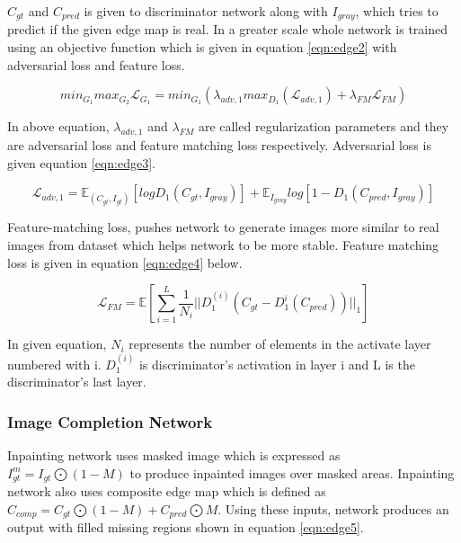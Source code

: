 \(C_{gt}\) and \(C_{pred}\) is given to discriminator network along with \(I_{gray}\), which tries to predict if the given edge map is real. In a greater scale whole network is trained using an objective function which is given in equation \ref{eqn:edge2} with adversarial loss and feature loss.

\begin{equation}
\label{eqn:edge2}
    min_{G_{1}}max_{G_{2}}\mathcal{L}_{G_{1}} = min_{G_{1}}(\lambda_{adv,1}max_{D_{1}}(\mathcal{L}_{adv,1})+\lambda_{FM} \mathcal{L}_{FM})
\end{equation}

In above equation, \(\lambda_{adv,1}\) and \(\lambda_{FM}\) are called regularization parameters and they are adversarial loss and feature matching loss respectively. Adversarial loss is given equation \ref{eqn:edge3}.

\begin{equation}
\label{eqn:edge3}
    \mathcal{L}_{adv,1} = \mathbb{E}_{(C_{gt},I_{gt})}[logD_{1}(C_{gt},I_{gray})]+\mathbb{E}_{I_{gray}}log[1-D_{1} (C_{pred}, I_{gray})]
\end{equation}

Feature-matching loss, pushes network to generate images more similar to real images from dataset which helps network to be more stable. Feature matching loss is given in equation \ref{eqn:edge4} below.

\begin{equation}
\label{eqn:edge4}
    \mathcal{L}_{FM} = \mathbb{E} [ \sum\limits^L_{i=1}{\frac{1}{N_i}|| D_1^(i) (C_{gt}-D_1^{i} (C_{pred})) ||_1} ]
\end{equation}

In given equation, \(N_i\) represents the number of elements in the activate layer numbered with i. \(D_1^{(i)} \) is discriminator’s activation in layer i and L is the discriminator’s last layer.

\subsubsection{Image Completion Network}

Inpainting network uses masked image which is expressed as  \(I^m_{gt}=I_{gt} \bigodot(1-M)\) to produce inpainted images over masked areas. Inpainting network also uses composite edge map which is defined as \(C_{comp}=C_{gt}  \bigodot (1-M)+C_{pred}  \bigodot M.\) Using these inputs, network produces an output with filled missing regions shown in equation \ref{eqn:edge5}.

